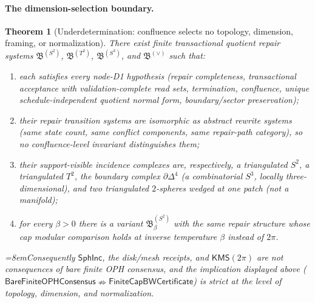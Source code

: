 \documentclass[11pt]{article}
\newtheorem{theorem}{Theorem}[section]
\begin{document}
\paragraph{The dimension-selection boundary.}

\begin{theorem}[Underdetermination: confluence selects no topology, dimension, framing, or normalization]
\label{thm:incidence-underdetermination}
There exist finite transactional quotient repair systems
\(\mathfrak B^{(S^2)}\), \(\mathfrak B^{(T^2)}\), \(\mathfrak B^{(S^3)}\), and
\(\mathfrak B^{(\vee)}\) such that:
\begin{enumerate}[leftmargin=2em]
\item each satisfies every node-D1 hypothesis (repair completeness,
transactional acceptance with validation-complete read sets, termination,
confluence, unique schedule-independent quotient normal form, boundary/sector
preservation);
\item their repair transition systems are isomorphic as abstract rewrite
systems (same state count, same conflict components, same repair-path
category), so no confluence-level invariant distinguishes them;
\item their support-visible incidence complexes are, respectively, a
triangulated \(S^2\), a triangulated \(T^2\), the boundary complex
\(\partial\Delta^4\) (a combinatorial \(S^3\), locally three-dimensional), and
two triangulated \(2\)-spheres wedged at one patch (not a manifold);
\item for every \(\beta>0\) there is a variant
\(\mathfrak B^{(S^2)}_\beta\) with the same repair structure whose cap modular
comparison holds at inverse temperature \(\beta\) instead of \(2\pi\).
\end{enumerate}
{\emergencystretch=8em\relax Consequently \(\mathsf{SphInc}\), the disk/mesh receipts, and
\(\mathsf{KMS}(2\pi)\) are not consequences of bare finite OPH consensus, and
the implication displayed above
(\(\mathsf{BareFiniteOPHConsensus}\nRightarrow\mathsf{FiniteCapBWCertificate}\))
is strict at the level of topology, dimension, and normalization.\par}
\end{theorem}
\end{document}
